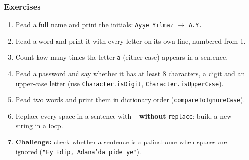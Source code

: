 \documentclass[aspectratio=169,10pt,compress]{beamer}
\begin{document}
\begin{frame}[t,fragile] \frametitle{Exercises}
  \begin{enumerate}\small
    \item Read a full name and print the initials: \texttt{Ayşe Yılmaz} $\to$ \texttt{A.Y.}
    \item Read a word and print it with every letter on its own line, numbered from 1.
    \item Count how many times the letter \texttt{a} (either case) appears in a sentence.
    \item Read a password and say whether it has at least 8 characters, a digit and an upper-case letter
          (use \texttt{Character.isDigit}, \texttt{Character.isUpperCase}).
    \item Read two words and print them in dictionary order (\texttt{compareToIgnoreCase}).
    \item Replace every space in a sentence with \texttt{\_} \textbf{without} \texttt{replace}: build a new string in a loop.
    \item \textbf{Challenge:} check whether a sentence is a palindrome when spaces are ignored
          (\texttt{"Ey Edip, Adana'da pide ye"}).
  \end{enumerate}
\end{frame}




\begin{frame}[t,fragile]
	\begin{center}
		\vspace{4cm}
	\end{center}
\end{frame}
\end{document}
